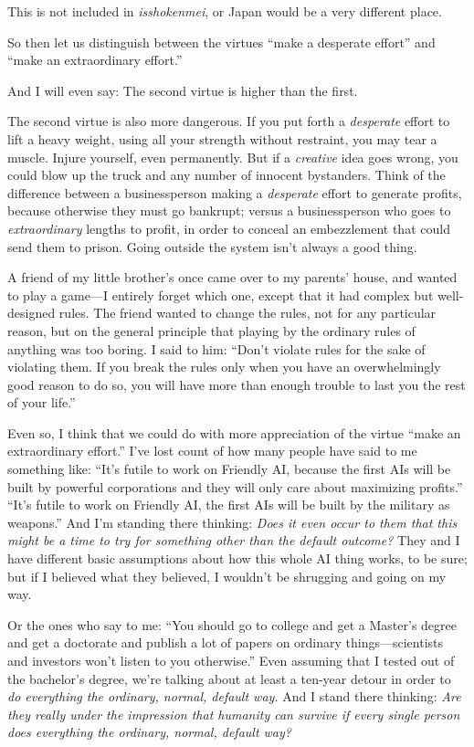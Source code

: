 {
 This is not included in \textit{isshokenmei}, or Japan would be a
very different place.}

{
 So then let us distinguish between the virtues
``make a desperate effort'' and
``make an extraordinary effort.''}

{
 And I will even say: The second virtue is higher than the first.}

{
 The second virtue is also more dangerous. If you put forth a
\textit{desperate} effort to lift a heavy weight, using all your
strength without restraint, you may tear a muscle. Injure yourself,
even permanently. But if a \textit{creative} idea goes wrong, you could
blow up the truck and any number of innocent bystanders. Think of the
difference between a businessperson making a \textit{desperate} effort
to generate profits, because otherwise they must go bankrupt; versus a
businessperson who goes to \textit{extraordinary} lengths to profit, in
order to conceal an embezzlement that could send them to prison. Going
outside the system isn't always a good thing.}

{
 A friend of my little brother's once came over to
my parents' house, and wanted to play a game---I
entirely forget which one, except that it had complex but well-designed
rules. The friend wanted to change the rules, not for any particular
reason, but on the general principle that playing by the ordinary rules
of anything was too boring. I said to him:
``Don't violate rules for the sake of
violating them. If you break the rules only when you have an
overwhelmingly good reason to do so, you will have more than enough
trouble to last you the rest of your life.''}

{
 Even so, I think that we could do with more appreciation of the
virtue ``make an extraordinary
effort.'' I've lost count of how many
people have said to me something like:
``It's futile to work on Friendly AI,
because the first AIs will be built by powerful corporations and they
will only care about maximizing profits.''
``It's futile to work on Friendly AI,
the first AIs will be built by the military as
weapons.'' And I'm standing there
thinking: \textit{Does it even occur to them that this might be a time
to try for something other than the default outcome?} They and I have
different basic assumptions about how this whole AI thing works, to be
sure; but if I believed what they believed, I wouldn't
be shrugging and going on my way.}

{
 Or the ones who say to me: ``You should go to
college and get a Master's degree and get a doctorate
and publish a lot of papers on ordinary things---scientists and
investors won't listen to you
otherwise.'' Even assuming that I tested out of the
bachelor's degree, we're talking about
at least a ten-year detour in order to \textit{do everything the
ordinary, normal, default way.} And I stand there thinking: \textit{Are
they really under the impression that humanity can survive if every
single person does everything the ordinary, normal, default way?}}


